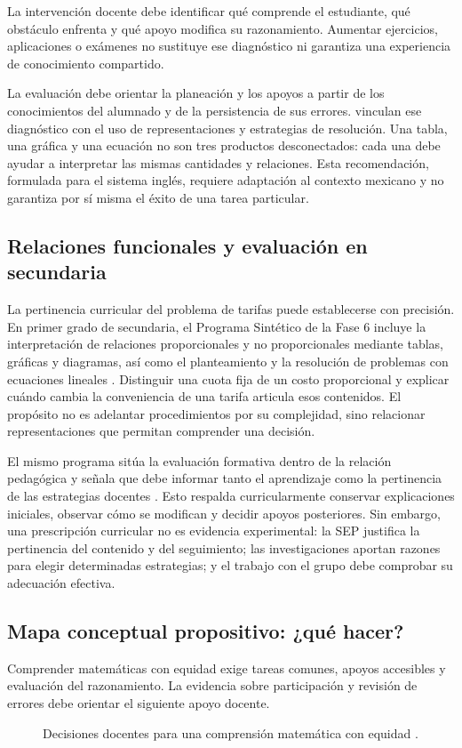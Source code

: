 \documentclass[spanish,letterpaper,oneside]{article}
\begin{document}
La intervención docente debe identificar qué comprende el estudiante, qué obstáculo enfrenta y qué apoyo modifica su razonamiento. Aumentar ejercicios, aplicaciones o exámenes no sustituye ese diagnóstico ni garantiza una experiencia de conocimiento compartido.

La evaluación debe orientar la planeación y los apoyos a partir de los conocimientos del alumnado y de la persistencia de sus errores. \citet[pp.~8--17]{eef2017mathematics} vinculan ese diagnóstico con el uso de representaciones y estrategias de resolución. Una tabla, una gráfica y una ecuación no son tres productos desconectados: cada una debe ayudar a interpretar las mismas cantidades y relaciones. Esta recomendación, formulada para el sistema inglés, requiere adaptación al contexto mexicano y no garantiza por sí misma el éxito de una tarea particular.

\subsection{Relaciones funcionales y evaluación en secundaria}

La pertinencia curricular del problema de tarifas puede establecerse con precisión. En primer grado de secundaria, el Programa Sintético de la Fase 6 incluye la interpretación de relaciones proporcionales y no proporcionales mediante tablas, gráficas y diagramas, así como el planteamiento y la resolución de problemas con ecuaciones lineales \citep[p.~59]{sep2024fase6}. Distinguir una cuota fija de un costo proporcional y explicar cuándo cambia la conveniencia de una tarifa articula esos contenidos. El propósito no es adelantar procedimientos por su complejidad, sino relacionar representaciones que permitan comprender una decisión.

El mismo programa sitúa la evaluación formativa dentro de la relación pedagógica y señala que debe informar tanto el aprendizaje como la pertinencia de las estrategias docentes \citep[pp.~125--126]{sep2024fase6}. Esto respalda curricularmente conservar explicaciones iniciales, observar cómo se modifican y decidir apoyos posteriores. Sin embargo, una prescripción curricular no es evidencia experimental: la SEP justifica la pertinencia del contenido y del seguimiento; las investigaciones aportan razones para elegir determinadas estrategias; y el trabajo con el grupo debe comprobar su adecuación efectiva.

\subsection{Mapa conceptual propositivo: ¿qué hacer?}
Comprender matemáticas con equidad exige tareas comunes, apoyos accesibles y evaluación del razonamiento. La evidencia sobre participación y revisión de errores debe orientar el siguiente apoyo docente.
\begin{figure}[H]
\centering
\resizebox{.98\linewidth}{!}{\MapaPropositivo}
\caption{Decisiones docentes para una comprensión matemática con equidad \citep{star2015algebra,eef2021feedback,sep2024fase6}.}
\label{fig:mapa-propositivo}
\end{figure}
\end{document}
